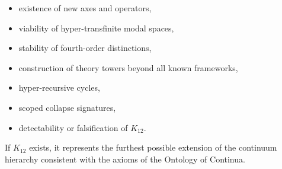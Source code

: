 \begin{itemize}
    \item existence of new axes and operators,
    \item viability of hyper-transfinite modal spaces,
    \item stability of fourth-order distinctions,
    \item construction of theory towers beyond all known frameworks,
    \item hyper-recursive cycles,
    \item scoped collapse signatures,
    \item detectability or falsification of $K_{12}$.
\end{itemize}

If $K_{12}$ exists, it represents the furthest possible extension of
the continuum hierarchy consistent with the axioms of the Ontology
of Continua.
